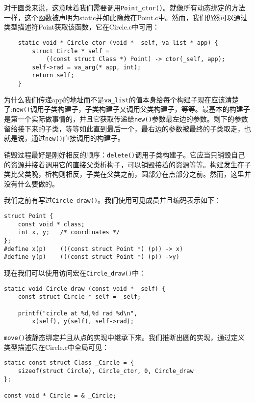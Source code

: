 对于圆类来说，这意味着我们需要调用\verb|Point_ctor()|。就像所有动态绑定的方法一样，这个函数被声明为static并如此隐藏在Point.c中。然而，我们仍然可以通过类型描述符Point获取该函数，它在Circle.c中可用：

\begin{lstlisting}
	static void * Circle_ctor (void * _self, va_list * app) {
		struct Circle * self = 
			((const struct Class *) Point) -> ctor(_self, app);
		self->rad = va_arg(* app, int);
		return self;
	}
\end{lstlisting}

为什么我们传递app的地址而不是\verb|va_list|的值本身给每个构建子现在应该清楚了:\verb|new()|调用子类构建子，子类构建子又调用父类构建子，等等。最基本的构建子是第一个实际做事情的，并且它获取传递给\verb|new()|参数最左边的参数。剩下的参数留给接下来的子类，等等如此直到最后一个，最右边的参数被最终的子类取走，也就是说，通过\verb|new()|直接调用的构建子。

销毁过程最好是刚好相反的顺序：\verb|delete()|调用子类构建子。它应当只销毁自己的资源并接着调用它的直接父类析构子，可以销毁接着的资源等等。构建发生在子类比父类晚，析构则相反，子类在父类之前，圆部分在点部分之前。然而，这里并没有什么要做的。

我们之前有写过\verb|Circle_draw()|。我们使用可见成员并且编码表示如下：

\begin{lstlisting}
struct Point {
	const void * class;
	int x, y;	/* coordinates */
};
#define x(p)	(((const struct Point *) (p)) -> x)
#define y(p)	(((const struct Point *) (p)) ->y)
\end{lstlisting}

现在我们可以使用访问宏在\verb|Circle_draw()|中：

\begin{lstlisting}
static void Circle_draw (const void * _self) {
	const struct Circle * self = _self;
	
	printf("circle at %d,%d rad %d\n",
		x(self), y(self), self->rad);
\end{lstlisting}

\verb|move()|被静态绑定并且从点的实现中继承下来。我们推断出圆的实现，通过定义类型描述只在Circle.c中全局可见：

\begin{lstlisting}
static const struct Class _Circle = {
	sizeof(struct Circle), Circle_ctor, 0, Circle_draw
};

const void * Circle = & _Circle;
\end{lstlisting}

